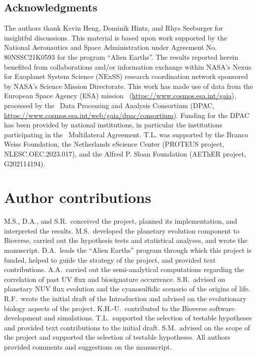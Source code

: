 \begin{acknowledgments}
\section*{Acknowledgments}
    The authors thank Kevin Heng, Dominik Hintz, and Rhys Seeburger for insightful discussions.
    This material is based upon work supported by the National Aeronautics and Space Administration under Agreement No. 80NSSC21K0593 for the program ``Alien Earths''.
    The results reported herein benefited from collaborations and/or information exchange within NASA’s Nexus for Exoplanet System Science (NExSS) research coordination network sponsored by NASA’s Science Mission Directorate.
    This work has made use of data from the European Space Agency (ESA) mission \gaia\ (\url{https://www.cosmos.esa.int/gaia}), processed by the \gaia\ Data Processing and Analysis Consortium (DPAC, \url{https://www.cosmos.esa.int/web/gaia/dpac/consortium}). Funding for the DPAC has been provided by national institutions, in particular the institutions participating in the \gaia\ Multilateral Agreement.
    T.L. was supported by the Branco Weiss Foundation, the Netherlands eScience Center (PROTEUS project, NLESC.OEC.2023.017), and the Alfred P. Sloan Foundation (AEThER project, G202114194).
\end{acknowledgments}

\section*{Author contributions}
M.S., D.A., and S.R.\ conceived the project, planned its implementation, and interpreted the results.
M.S.\ developed the planetary evolution component to Bioverse, carried out the hypothesis tests and statistical analyses, and wrote the manuscript.
D.A.\ leads the ``Alien Earths'' program through which this project is funded, helped to guide the strategy of the project, and provided text contributions.
A.A.\ carried out the semi-analytical computations regarding the correlation of past UV flux and biosignature occurrence.
S.R.\ advised on planetary \gls{NUV} flux evolution and the cyanosulfidic scenario of the origins of life.
R.F.\ wrote the initial draft of the Introduction and advised on the evolutionary biology aspects of the project.
K.H.-U.\ contributed to the Bioverse software development and simulations.
T.L.\ supported the selection of testable hypotheses and provided text contributions to the initial draft.
S.M.\ advised on the scope of the project and supported the selection of testable hypotheses.
All authors provided comments and suggestions on the manuscript.


